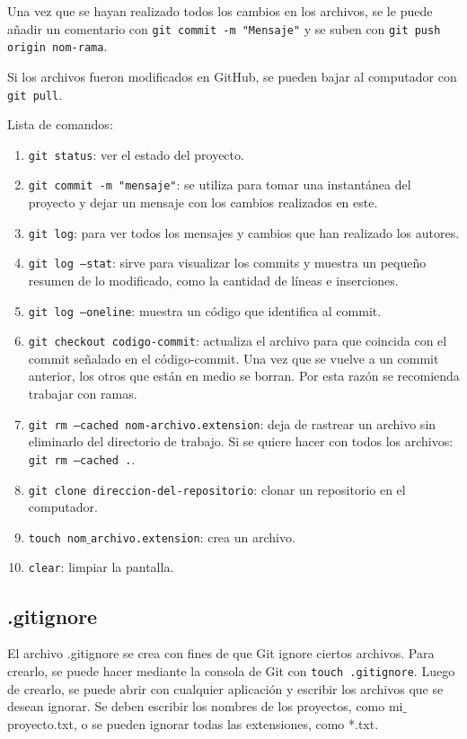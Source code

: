 \documentclass[a4paper, 12pt]{book}
\begin{document}
Una vez que se hayan realizado todos los cambios en los archivos, se le puede añadir un comentario con \texttt{git commit -m "Mensaje"} y se suben con \texttt{git push origin nom-rama}.

Si los archivos fueron modificados en GitHub, se pueden bajar al computador con \texttt{git pull}.

Lista de comandos: 
\begin{enumerate}
\item \texttt{git status}: ver el estado del proyecto.
\item \texttt{git commit -m "mensaje"}: se utiliza para tomar una instantánea del proyecto y dejar un mensaje con los cambios realizados en este.
\item \texttt{git log}: para ver todos los mensajes y cambios que han realizado los autores.
\item \texttt{git log --stat}: sirve para visualizar los commits y muestra un pequeño resumen de lo modificado, como la cantidad de líneas e inserciones.
\item \texttt{git log --oneline}: muestra un código que identifica al commit.
\item \texttt{git checkout codigo-commit}: actualiza el archivo para que coincida con el commit señalado en el código-commit. Una vez que se vuelve a un commit anterior, los otros que están en medio se borran. Por esta razón se recomienda trabajar con ramas.
\item \texttt{git rm --cached nom-archivo.extension}: deja de rastrear un archivo sin eliminarlo del directorio de trabajo. Si se quiere hacer con todos los archivos: \texttt{git rm --cached .}.
\item \texttt{git clone direccion-del-repositorio}: clonar un repositorio en el computador.
\item \texttt{touch nom$\_$archivo.extension}: crea un archivo.
\item \texttt{clear}: limpiar la pantalla.
\end{enumerate}
\subsection{.gitignore}
El archivo .gitignore se crea con fines de que Git ignore ciertos archivos. Para crearlo, se puede hacer mediante la consola de Git con \texttt{touch .gitignore}. Luego de crearlo, se puede abrir con cualquier aplicación y escribir los archivos que se desean ignorar. Se deben escribir los nombres de los proyectos, como mi$\_$proyecto.txt, o se pueden ignorar todas las extensiones, como *.txt.
\end{document}
